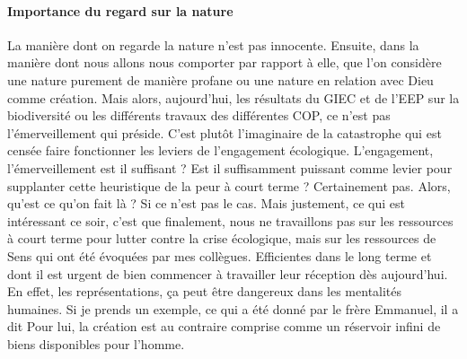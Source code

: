 \paragraph{Importance du regard sur la nature }
La manière dont on regarde la nature n'est pas innocente. Ensuite, dans la manière dont nous allons nous comporter par rapport à elle, que l'on considère une nature purement de manière profane ou une nature en relation avec Dieu comme création. Mais alors, aujourd'hui, les résultats du GIEC et de l'EEP sur la biodiversité ou les différents travaux des différentes COP, ce n'est pas l'émerveillement qui préside.
C'est plutôt l'imaginaire de la catastrophe qui est censée faire fonctionner les leviers de l'engagement écologique. L'engagement, l'émerveillement est il suffisant ? Est il suffisamment puissant comme levier pour supplanter cette heuristique de la peur à court terme ? Certainement pas. Alors, qu'est ce qu'on fait là ? Si ce n'est pas le cas. Mais justement, ce qui est intéressant ce soir, c'est que finalement, nous ne travaillons pas sur les ressources à court terme pour lutter contre la crise écologique, mais sur les ressources de Sens qui ont été évoquées par mes collègues.
Efficientes dans le long terme et dont il est urgent de bien commencer à travailler leur réception dès aujourd'hui. En effet, les représentations, ça peut être dangereux dans les mentalités humaines. Si je prends un exemple, ce qui a été donné par le frère Emmanuel, il a dit Pour lui, la création est au contraire comprise comme un réservoir infini de biens disponibles pour l'homme.


